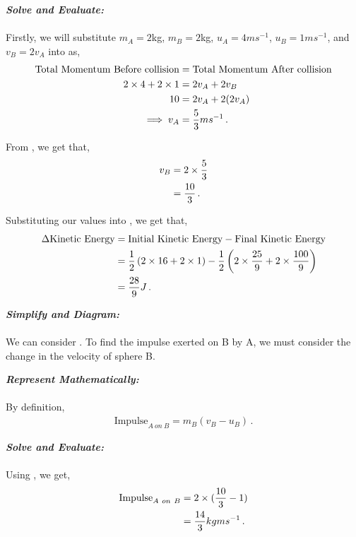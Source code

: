 \begin{subquestions}
\begin{subsubquestions}
\textbf{\textit{Solve and Evaluate:}} \\ \\
Firstly, we will substitute $m_A=2$kg, $m_B=2$kg, $u_A=4ms^{-1}$, $u_B=1ms^{-1}$, and $v_B=2v_A$ into  as,
\begin{align}
	\text{Total Momentum Before collision} & = \text{Total Momentum After collision} \nonumber \\
	2\times 4 + 2\times 1 & = 2v_A+2v_B \nonumber \\
	10 & = 2v_A+2(2v_A) \nonumber \\
	\implies v_A & = \frac{5}{3}ms^{-1} \,.
\end{align}
	
From , we get that,
\begin{align}
	v_B & = 2\times \frac{5}{3} \nonumber \\
	    & = \frac{10}{3} \,.
\end{align}
	
Substituting our values into , we get that,
\begin{align}
	\Delta \text{Kinetic Energy} & = \text{Initial Kinetic Energy} - \text{Final Kinetic Energy} \nonumber \\
								 & = \frac{1}{2}\left(2\times 16 + 2\times 1\right) - \frac{1}{2}\left(2\times \frac{25}{9}+ 2\times \frac{100}{9}\right) \nonumber \\
								 & = \frac{28}{9} J \,.
\end{align}
	

\subsubquestion

\textbf{\textit{Simplify and Diagram:}} \\ \\
We can consider . To find the impulse exerted on B by A, we must consider the change in the velocity of sphere B.




\textbf{\textit{Represent Mathematically:}} \\ \\
By definition,
\begin{align}
	\text{Impulse}_{A~on~B} = m_B(v_B-u_B) \label{2008M:q5:Impulse} \,.
\end{align}




\textbf{\textit{Solve and Evaluate:}} \\ \\
Using , we get,
\begin{align}
	\text{Impulse}_{A~on~B} & = 2\times (\frac{10}{3}-1) \nonumber \\
						    & = \frac{14}{3} kgms^{-1} \,.
\end{align}


\end{subsubquestions}
\end{subquestions}
